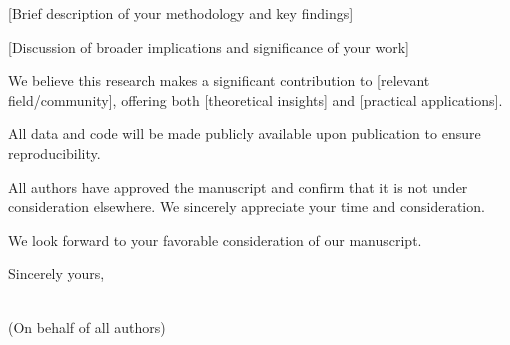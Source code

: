 \documentclass{article}
\begin{document}
\bigskip

[Brief description of your methodology and key findings]

[Discussion of broader implications and significance of your work]

We believe this research makes a significant contribution to [relevant field/community], offering both [theoretical insights] and [practical applications].


All data and code will be made publicly available upon publication to ensure reproducibility.

All authors have approved the manuscript and confirm that it is not under consideration elsewhere. We sincerely appreciate your time and consideration.

We look forward to your favorable consideration of our manuscript.

\bigskip %

Sincerely yours,

\vspace{20pt} %

\correspondingAuthorName \\
(On behalf of all authors)
\end{document}
